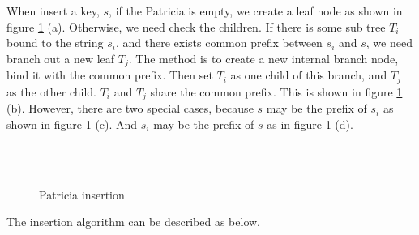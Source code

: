 \documentclass{article}
\begin{document}
When insert a key, $s$, if the Patricia is empty, we
create a leaf node as shown in figure \ref{fig:patricia-insert} (a).
Otherwise, we need check the children.
If there is some sub tree $T_i$ bound to the string $s_i$,
and there exists common prefix between $s_i$ and $s$, we
need branch out a new leaf $T_j$. The method is to
create a new internal branch node, bind it with the common
prefix. Then set $T_i$ as one child of this branch, and
$T_j$ as the other child. $T_i$ and $T_j$ share the common
prefix. This is shown in figure \ref{fig:patricia-insert} (b).
However, there are two special cases, because $s$ may be the prefix of $s_i$
as shown in figure \ref{fig:patricia-insert} (c). And
$s_i$ may be the prefix of $s$ as in figure \ref{fig:patricia-insert} (d).

\begin{figure}[htbp]
  \centering
   \\
   \\
  \caption{Patricia insertion}
  \label{fig:patricia-insert}
\end{figure}

The insertion algorithm can be described as below.
\end{document}
